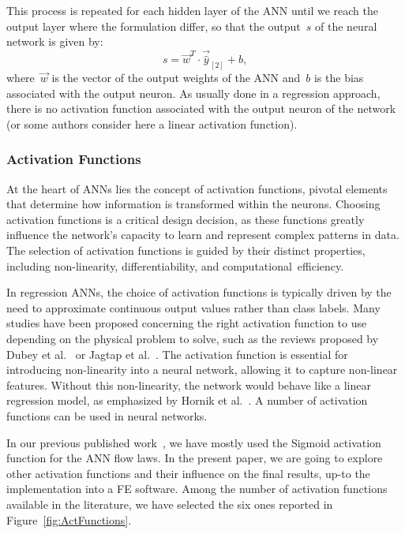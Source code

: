 \documentclass[algorithms,article,accept,pdftex,oneauthor]{Definitions/mdpi}
\DeclareRobustCommand{\lay}[1]{_{[#1]}}
\begin{document}
This %
 process is repeated for each hidden layer of the ANN until we reach the output layer where the formulation differ, so that the output~$s$ of the neural network is given by:
\begin{equation}
s = \overrightarrow{w}^T \cdot \overrightarrow{\hat{y}}\lay{2} + b\label{eq:ANN-s},
\end{equation}
where~$\overrightarrow{w}$ is the vector of the output weights of the ANN and~$b$ is the bias associated with the output neuron.
As usually done in a regression approach, there is no activation function associated with the output neuron of the network (or some authors consider here a linear activation function).

\subsubsection{Activation Functions}\label{subsubsec:ANN-act}

At the heart of ANNs lies the concept of activation functions, pivotal elements that determine how information is transformed within the neurons.
Choosing activation functions is a critical design decision, as these functions greatly influence the network's capacity to learn and represent complex patterns in data.
The selection of activation functions is guided by their distinct properties, including non-linearity, differentiability, and computational~efficiency.

In regression ANNs, the choice of activation functions is typically driven by the need to approximate continuous output values rather than class labels.
Many studies have been proposed concerning the right activation function to use depending on the physical problem to solve, such as the reviews proposed by Dubey et al.~\cite{Dubey-2022-AFD} or Jagtap et al.~\cite{Jagtap-2023-HIA}.
The activation function is essential for introducing non-linearity into a neural network, allowing it to capture non-linear features.
Without this non-linearity, the network would behave like a linear regression model, as emphasized by Hornik et al.~\cite{Hornik-1989-MFN}.
A number of activation functions can be used in neural networks.

In our previous published work~\cite{Pantale-2021-EIN, Pantale-2023-DIA}, we have mostly used the Sigmoid activation function for the ANN flow laws.
In the present paper, we are going to explore other activation functions and their influence on the final results, up-to the implementation into a FE software.
Among the number of activation functions available in the literature, we have selected the six ones reported in Figure~\ref{fig:ActFunctions}.
\vspace{-3pt}
\end{document}
